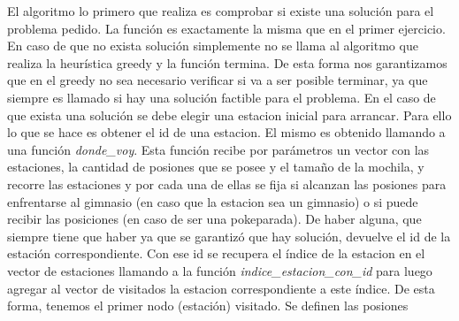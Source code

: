             El algoritmo lo primero que realiza es comprobar si existe una solución para el problema pedido. La función es exactamente la misma que en el primer ejercicio. En caso de que no exista solución simplemente no se llama al algoritmo que realiza la heurística greedy y la función termina. De esta forma nos garantizamos que en el greedy no sea necesario verificar si va a ser posible terminar, ya que siempre es llamado si hay una solución factible para el problema. En el caso de que exista una solución se debe elegir una estacion inicial para arrancar. Para ello lo que se hace es obtener el id de una estacion. El mismo es obtenido llamando a una función \textit{donde_voy}. Esta función recibe por parámetros un vector con las estaciones, la cantidad de posiones que se posee y el tamaño de la mochila, y recorre las estaciones y por cada una de ellas se fija si alcanzan las posiones para enfrentarse al gimnasio (en caso que la estacion sea un gimnasio) o si puede recibir las posiciones (en caso de ser una pokeparada). De haber alguna, que siempre tiene que haber ya que se garantizó que hay solución, devuelve el id de la estación correspondiente. Con ese id se recupera el índice de la estacion en el vector de estaciones llamando a la función \textit{indice_estacion_con_id} para luego agregar al vector de visitados la estacion correspondiente a este índice. De esta forma, tenemos el primer nodo (estación) visitado. Se definen las posiones 